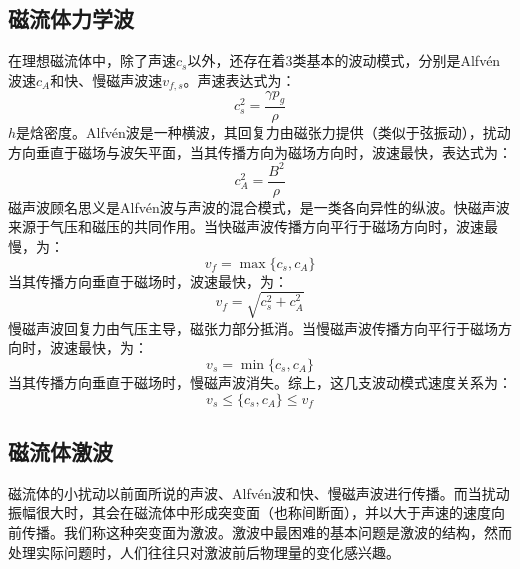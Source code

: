 \documentclass[lang=cn,color=blue,cm,11pt,scheme=chinese,bibend=bibtex,sorting=nty]{elegantbook}
\begin{document}
	\subsection{磁流体力学波}
	
	在理想磁流体中，除了声速$c_s$以外，还存在着3类基本的波动模式，分别是Alfvén波速$c_A$和快、慢磁声波速$v_{f,s}$。声速表达式为：
	\begin{equation}
		c_s^2 = \frac{\gamma p_g}{\rho}
	\end{equation}
	$h$是焓密度。Alfvén波是一种横波，其回复力由磁张力提供（类似于弦振动），扰动方向垂直于磁场与波矢平面，当其传播方向为磁场方向时，波速最快，表达式为：
	\begin{equation}
		c_A^2 = \frac{B^2}{\rho}
	\end{equation}
	磁声波顾名思义是Alfvén波与声波的混合模式，是一类各向异性的纵波。快磁声波来源于气压和磁压的共同作用。当快磁声波传播方向平行于磁场方向时，波速最慢，为：
	\begin{equation}
		v_f = \max \{ c_s, c_A \}
	\end{equation}
	当其传播方向垂直于磁场时，波速最快，为：
	\begin{equation}
		v_f = \sqrt{c_s^2 + c_A^2}
	\end{equation}
	慢磁声波回复力由气压主导，磁张力部分抵消。当慢磁声波传播方向平行于磁场方向时，波速最快，为：
	\begin{equation}
		v_s = \min \{ c_s, c_A \}
	\end{equation}
	当其传播方向垂直于磁场时，慢磁声波消失。综上，这几支波动模式速度关系为：
	\begin{equation}
		v_s \leqslant \{ c_s, c_A \} \leqslant v_f
	\end{equation}
	
	\subsection{磁流体激波}
	
	磁流体的小扰动以前面所说的声波、Alfvén波和快、慢磁声波进行传播。而当扰动振幅很大时，其会在磁流体中形成突变面（也称间断面），并以大于声速的速度向前传播。我们称这种突变面为激波。激波中最困难的基本问题是激波的结构，然而处理实际问题时，人们往往只对激波前后物理量的变化感兴趣。
	
\end{document}
